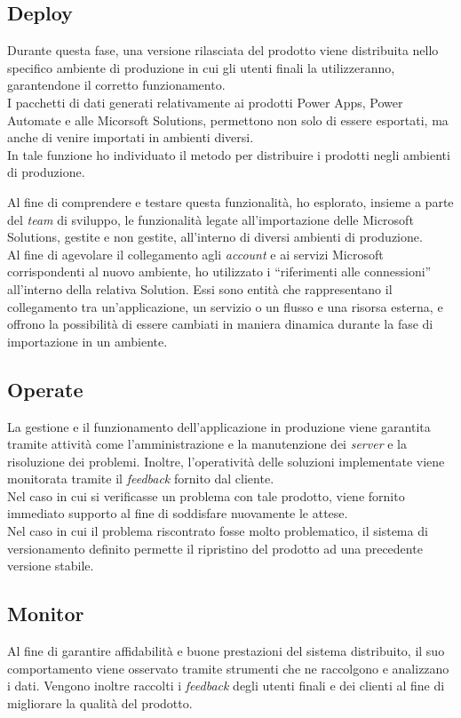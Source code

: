 \subsection{Deploy}
Durante questa fase, una versione rilasciata del prodotto viene distribuita nello specifico ambiente di produzione in cui gli utenti finali la utilizzeranno, garantendone il corretto funzionamento.\\

I pacchetti di dati generati relativamente ai prodotti Power Apps, Power Automate e alle Micorsoft Solutions, permettono non solo di essere esportati, ma anche di venire importati in ambienti diversi.\\
In tale funzione ho individuato il metodo per distribuire i prodotti negli ambienti di produzione. 
    
Al fine di comprendere e testare questa funzionalità, ho esplorato, insieme a parte del \emph{team} di sviluppo, le funzionalità legate all'importazione delle Microsoft Solutions, gestite e non gestite, all'interno di diversi ambienti di produzione.\\ 
Al fine di agevolare il collegamento agli \emph{account} e ai servizi Microsoft corrispondenti al nuovo ambiente, ho utilizzato i “riferimenti alle connessioni” all'interno della relativa Solution.
Essi sono entità che rappresentano il collegamento tra un'applicazione, un servizio o un flusso e una risorsa esterna, e offrono la possibilità di essere cambiati in maniera dinamica durante la fase di importazione in un ambiente.\\
    

\subsection{Operate}
La gestione e il funzionamento dell'applicazione in produzione viene garantita tramite attività come l'amministrazione e la manutenzione dei \emph{server} e la risoluzione dei problemi. 
Inoltre, l'operatività delle soluzioni implementate viene monitorata tramite il \emph{feedback} fornito dal cliente.\\
Nel caso in cui si verificasse un problema con tale prodotto, viene fornito immediato supporto al fine di soddisfare nuovamente le attese.\\
Nel caso in cui il problema riscontrato fosse molto problematico, il sistema di versionamento definito permette il ripristino del prodotto ad una precedente versione stabile. 

\subsection{Monitor}
Al fine di garantire affidabilità e buone prestazioni del sistema distribuito, il suo comportamento viene osservato tramite strumenti che ne raccolgono e analizzano i dati. 
Vengono inoltre raccolti i \emph{feedback} degli utenti finali e dei clienti al fine di migliorare la qualità del prodotto. 

